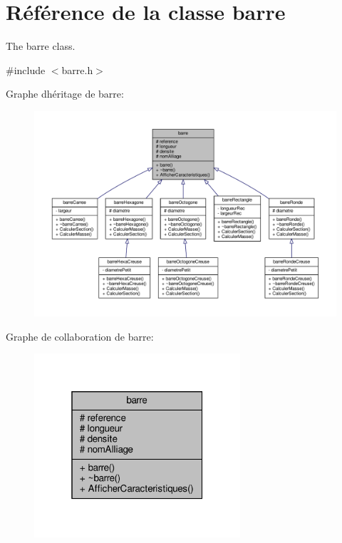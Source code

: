 \hypertarget{classbarre}{}\section{Référence de la classe barre}
\label{classbarre}


The barre class.  




{\ttfamily \#include $<$barre.\+h$>$}



Graphe d\textquotesingle{}héritage de barre\+:
\nopagebreak
\begin{figure}[H]
\begin{center}
\leavevmode
\includegraphics[width=350pt]{classbarre__inherit__graph}
\end{center}
\end{figure}


Graphe de collaboration de barre\+:
\nopagebreak
\begin{figure}[H]
\begin{center}
\leavevmode
\includegraphics[width=217pt]{classbarre__coll__graph}
\end{center}
\end{figure}
